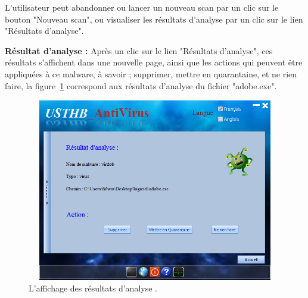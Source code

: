 \begin{list}{•}{}
L'utilisateur peut abandonner ou lancer un  nouveau scan par un clic sur le bouton "Nouveau scan", ou visualiser les résultats d'analyse par un clic sur le lien "Résultats d'analyse".
\item \textbf{Résultat d'analyse :}
Après un clic sur le lien "Résultats d'analyse", ces résultats s'affichent dans une nouvelle page, ainsi que les actions qui peuvent être appliquées à ce malware, à savoir ; supprimer, mettre en quarantaine, et ne rien faire, la figure~\ref{fig :ant11} correspond aux résultats d'analyse du fichier "adobe.exe".\\
\begin{figure}[H]
\begin{center}
\includegraphics[width=13cm, height=8cm]{Figures/ant11.png}
\caption{L'affichage des résultats d'analyse .}
\label{fig :ant11} 
\end{center}
\end{figure}
\end{list}

